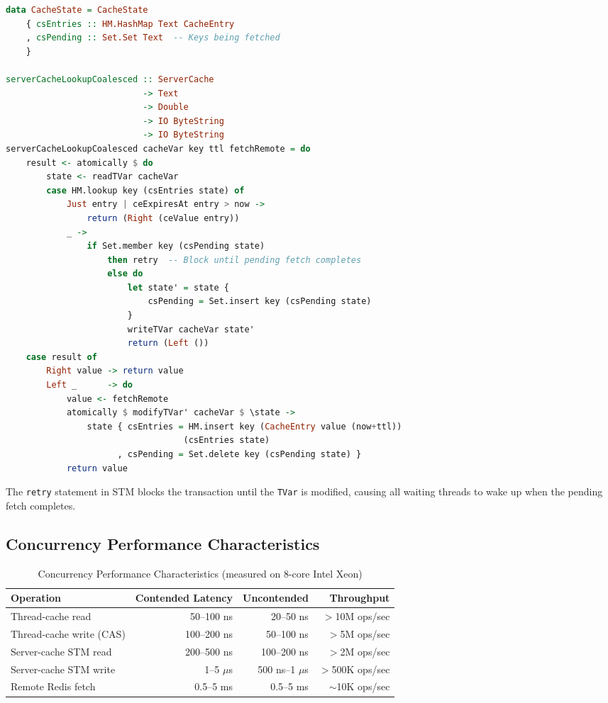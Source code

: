 \documentclass[12pt,a4paper]{report}
\begin{document}
\begin{lstlisting}[language=Haskell, caption={Request Coalescing with STM}]
data CacheState = CacheState
    { csEntries :: HM.HashMap Text CacheEntry
    , csPending :: Set.Set Text  -- Keys being fetched
    }

serverCacheLookupCoalesced :: ServerCache
                           -> Text
                           -> Double
                           -> IO ByteString
                           -> IO ByteString
serverCacheLookupCoalesced cacheVar key ttl fetchRemote = do
    result <- atomically $ do
        state <- readTVar cacheVar
        case HM.lookup key (csEntries state) of
            Just entry | ceExpiresAt entry > now ->
                return (Right (ceValue entry))
            _ -> 
                if Set.member key (csPending state)
                    then retry  -- Block until pending fetch completes
                    else do
                        let state' = state { 
                            csPending = Set.insert key (csPending state) 
                        }
                        writeTVar cacheVar state'
                        return (Left ())
    case result of
        Right value -> return value
        Left _      -> do
            value <- fetchRemote
            atomically $ modifyTVar' cacheVar $ \state ->
                state { csEntries = HM.insert key (CacheEntry value (now+ttl)) 
                                   (csEntries state)
                      , csPending = Set.delete key (csPending state) }
            return value
\end{lstlisting}

The \texttt{retry} statement in STM blocks the transaction until the \texttt{TVar} is modified, causing all waiting threads to wake up when the pending fetch completes.

\subsection{Concurrency Performance Characteristics}

\begin{table}[h]
\centering
\begin{tabular}{@{} l r r r @{}}
\toprule
\textbf{Operation} & \textbf{Contended Latency} & \textbf{Uncontended} & \textbf{Throughput} \\
\midrule
Thread-cache read & 50--100 ns & 20--50 ns & $>$10M ops/sec \\
Thread-cache write (CAS) & 100--200 ns & 50--100 ns & $>$5M ops/sec \\
Server-cache STM read & 200--500 ns & 100--200 ns & $>$2M ops/sec \\
Server-cache STM write & 1--5 $\mu$s & 500 ns--1 $\mu$s & $>$500K ops/sec \\
Remote Redis fetch & 0.5--5 ms & 0.5--5 ms & $\sim$10K ops/sec \\
\bottomrule
\end{tabular}
\caption{Concurrency Performance Characteristics (measured on 8-core Intel Xeon)}
\label{tab:concurrency-perf}
\end{table}
\end{document}
